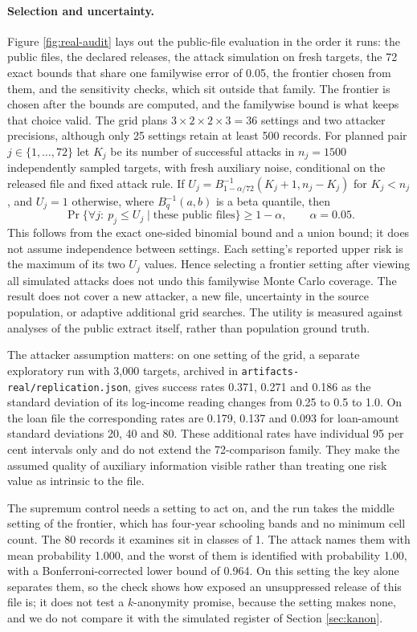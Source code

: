 \documentclass[11pt,a4paper]{article}
\theoremstyle{plain}
\theoremstyle{definition}
\theoremstyle{definition}
\theoremstyle{plain}
\begin{document}
\paragraph{Selection and uncertainty.} Figure \ref{fig:real-audit} lays out the
public-file evaluation in the order it runs: the public files, the declared
releases, the attack simulation on fresh targets, the 72 exact bounds that share
one familywise error of 0.05, the frontier chosen from them, and the sensitivity
checks, which sit outside that family. The frontier is chosen after the bounds
are computed, and the familywise bound is what keeps that choice valid. The
grid plans $3\times2\times2\times3=36$
settings and two attacker precisions, although only 25 settings retain at least
500 records. For planned pair $j\in\{1,\ldots,72\}$ let $K_j$ be its number of
successful attacks in $n_j=1500$ independently sampled targets, with fresh
auxiliary noise, conditional on the released file and fixed attack rule. If
$U_j=B^{-1}_{1-\alpha/72}(K_j+1,n_j-K_j)$ for $K_j<n_j$, and $U_j=1$
otherwise, where $B^{-1}_q(a,b)$ is a beta quantile, then
\[
 \Pr\{\forall j:\ p_j\le U_j\mid\text{these public files}\}\ge1-\alpha,
 \qquad \alpha=0.05.
\]
This follows from the exact one-sided binomial bound and a union bound; it does
not assume independence between settings. Each setting's reported upper risk
is the maximum of its two $U_j$ values. Hence selecting a frontier setting
after viewing all simulated attacks does not undo this familywise Monte Carlo
coverage. The result does not cover a new attacker, a new file, uncertainty in
the source population, or adaptive additional grid searches. The utility is
measured against analyses of the public extract itself, rather than population
ground truth.



The attacker assumption matters: on one setting of the grid, a separate
exploratory run with 3,000 targets, archived in
\texttt{artifacts-real/replication.json}, gives success rates 0.371, 0.271 and 0.186
as the standard deviation of its log-income reading changes from 0.25 to 0.5
to 1.0. On the loan file the corresponding rates are 0.179, 0.137 and 0.093
for loan-amount standard deviations 20, 40 and 80. These additional rates have
individual 95 per cent intervals only and do not extend the 72-comparison
family. They make the assumed quality of auxiliary information visible rather
than treating one risk value as intrinsic to the file.

The supremum control needs a setting to act on, and the run takes the middle
setting of the frontier, which has four-year schooling bands and no minimum cell
count. The 80 records it examines sit in classes of 1. The attack names them with
mean probability 1.000, and the worst of them is identified with probability 1.00,
with a Bonferroni-corrected lower bound of 0.964. On this setting the key alone
separates them, so the check shows how exposed an unsuppressed release of this
file is; it does not test a $k$-anonymity promise, because the setting makes
none, and we do not compare it with the simulated register of Section
\ref{sec:kanon}.
\end{document}
